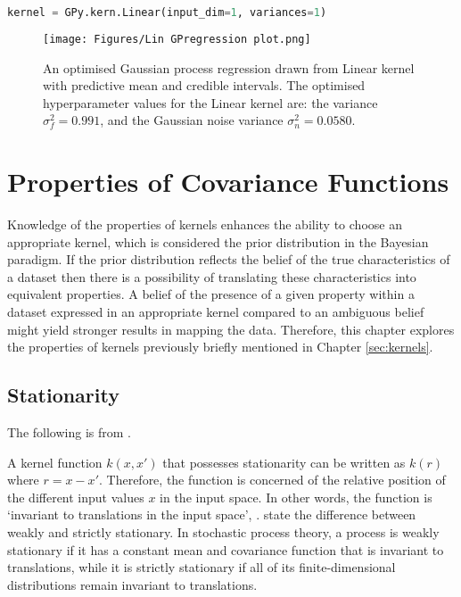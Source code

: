 \documentclass[12pt,a4paper]{article}
\begin{document}
\vspace{10pt}
\begin{lstlisting}[language=python, caption={Code of creating the Linear kernel.}, label={lst:Lin kernel}]
kernel = GPy.kern.Linear(input_dim=1, variances=1)
\end{lstlisting}

\begin{figure}[h]
\centering
\texttt{[image: Figures/Lin GPregression plot.png]} 
\caption{An optimised Gaussian process regression drawn from Linear kernel with predictive mean and credible intervals. The optimised hyperparameter values for the Linear kernel are: the variance \(\sigma_f^2 = 0.991\), and the Gaussian noise variance \(\sigma_n^2 = 0.0580\). } \label{fig:Lin GPregression}
\end{figure}

\newpage
\section{Properties of Covariance Functions}
\label{sec:prop of kernels}

Knowledge of the properties of kernels enhances the ability to choose an appropriate kernel, which is considered the prior distribution in the Bayesian paradigm. If the prior distribution reflects the belief of the true characteristics of a dataset then there is a possibility of translating these characteristics into equivalent properties. A belief of the presence of a given property within a dataset expressed in an appropriate kernel compared to an ambiguous belief might yield stronger results in mapping the data. Therefore, this chapter explores the properties of kernels previously briefly mentioned in Chapter \ref{sec:kernels}.

\subsection{Stationarity}
\label{sec:stationarity}

The following is from \citet{williams2006gaussian}.

A kernel function \(k(x,x')\) that possesses stationarity can be written as \(k(r)\) where \(r = x - x'\). Therefore, the function is concerned of the relative position of the different input values \(x\) in the input space.  In other words, the function is `invariant to translations in the input space', \citep[pp.~79]{williams2006gaussian}. \citet{papoulis02} state the difference between weakly and strictly stationary. In stochastic process theory, a process is weakly stationary if it has a constant mean and covariance function that is invariant to translations, while it is strictly stationary if all of its finite-dimensional distributions remain invariant to translations. 
\end{document}
